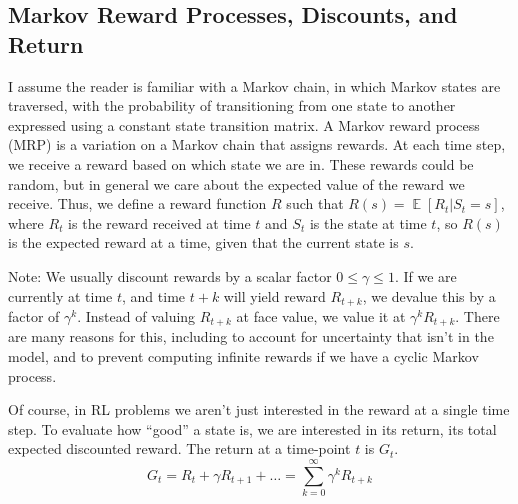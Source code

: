\documentclass{article}
\DeclareMathOperator{\EX}{\mathbb{E}}
\begin{document}
\subsection{Markov Reward Processes, Discounts, and Return}
I assume the reader is familiar with a Markov chain, in which Markov states are traversed, with the probability of transitioning from one state to another expressed using a constant state transition matrix. A Markov reward process (MRP) is a variation on a Markov chain that assigns rewards. At each time step, we receive a reward based on which state we are in. These rewards could be random, but in general we care about the expected value of the reward we receive. Thus, we define a reward function $R$ such that $R(s) = \EX[R_t | S_t = s]$, where $R_t$ is the reward received at time $t$ and $S_t$ is the state at time $t$, so $R(s)$ is the expected reward at a time, given that the current state is $s$.

Note: We usually discount rewards by a scalar factor $0 \leq \gamma \leq 1$. If we are currently at time $t$, and time $t+k$ will yield reward $R_{t+k}$, we devalue this by a factor of $\gamma^k$. Instead of valuing $R_{t+k}$ at face value, we value it at $\gamma^kR_{t+k}$. There are many reasons for this, including to account for uncertainty that isn’t in the model, and to prevent computing infinite rewards if we have a cyclic Markov process.

Of course, in RL problems we aren’t just interested in the reward at a single time step. To evaluate how “good” a state is, we are interested in its return, its total expected discounted reward. The return at a time-point $t$ is $G_t$.
\begin{equation}\label{eq:return_definition}
G_t = R_t + \gamma R_{t+1} + \ldots = \sum_{k=0}^\infty \gamma^kR_{t+k}
\end{equation}
\end{document}
